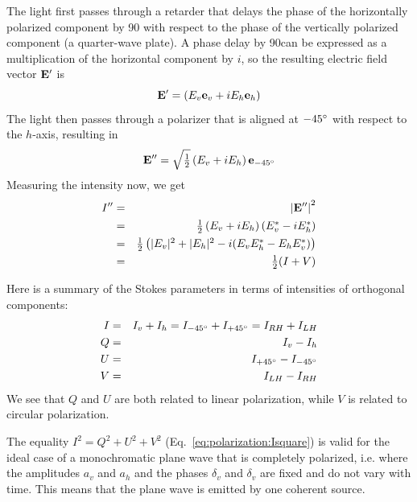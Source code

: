 The light first passes through a retarder that delays the phase of
the horizontally polarized component by 90\degree{} with respect to
the phase of the vertically polarized component (a quarter-wave
plate).
A phase delay by 90\degree can be expressed as a multiplication of the
horizontal component by $i$, so the resulting
electric field vector $\mathbf{E}^\prime$ is
\begin{equation}
  \label{eq:polarization:E_retarded}
  \mathbf{E}^\prime = \left(E_v \mathbf{e}_v +   i E_h \mathbf{e}_h \right) 
\end{equation}
The light then passes through a polarizer that is  aligned at
$-45^\circ$ with respect to the $h$-axis, resulting in
\begin{equation}
  \label{eq:polarization:E_retarded_polarized}
  \mathbf{E}^{\prime\prime} 
   = \sqrt{\textstyle\frac{1}{2}}\left(E_v  +  i E_h  \right) \mathbf{e}_{-45^\circ} 
\end{equation}
Measuring the intensity now, we get
\begin{eqnarray}
  I^{\prime\prime} 
   &=&  \left| \mathbf{E}^{\prime\prime} \right| ^2 \\ \nonumber
   &=& \textstyle\frac{1}{2}\left(E_v +  i E_h  \right)  
     \left(E_v^\ast -  i E_h^\ast  \right)\\ \nonumber
   &=& \textstyle\frac{1}{2} \left( |E_v|^2 + |E_h|^2 - 
        i (E_v E_h^\ast -  E_h E_v^\ast )\right) \\ \nonumber
   &=& \textstyle\frac{1}{2} ( I + V )
  \label{eq:polarization:I_retarded_polarized}
\end{eqnarray}


Here is a summary of the Stokes parameters in terms of intensities of
orthogonal components:
\begin{eqnarray}
  \label{eq:polarization:stokesparam_Idiff_I}
  I &=& I_v + I_h = I_{-45^\circ} + I_{+45^\circ} = I_{RH} + I_{LH}\\
  \label{eq:polarization:stokesparam_Idiff_Q}
  Q &=&   I_v - I_h \\
  \label{eq:polarization:stokesparam_Idiff_U}
  U &=&  I_{+45^\circ} - I_{-45^\circ} \\
  \label{eq:polarization:stokesparam_Idiff_V}
  V &=&  I_{LH} - I_{RH}
\end{eqnarray}
We see that $Q$ and $U$ are both related to linear polarization, while
$V$ is related to circular polarization.




\label{sec:polarization:part_pol}
The equality   $I^2 = Q^2 + U^2 + V^2$
(Eq.~\ref{eq:polarization:Isquare}) 
is valid for the ideal case of a 
monochromatic plane wave that is completely polarized, i.e. where the
amplitudes $a_v$ and
$a_h$ and the phases $\delta_v$ and $\delta_v$ are fixed and do not
vary with time. This means that the plane wave is emitted by one
coherent source.


